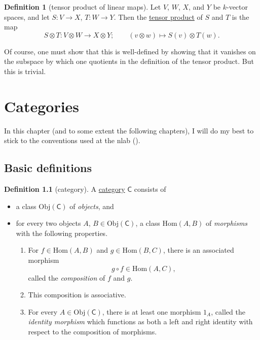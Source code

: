 \documentclass[a4paper]{report}
\newcommand{\defn}[1]{\ul{#1}}
\newcommand{\Obj}{\mathrm{Obj}}
\newcommand{\Hom}{\mathrm{Hom}}
\theoremstyle{definition}
\newtheorem{definition}{Definition}[section]
\theoremstyle{plain}
\theoremstyle{remark}
\begin{document}
\begin{definition}[tensor product of linear maps]
  \label{def:tensorproductoflinearmaps}
  Let $V$, $W$, $X$, and $Y$ be $k$-vector spaces, and let $S\colon V \to X$, $T\colon W \to Y$. Then the \defn{tensor product} of $S$ and $T$ is the map
  \begin{equation*}
    S \otimes T\colon V \otimes W \to X \otimes Y;\qquad (v \otimes w) \mapsto S(v) \otimes T(w).
  \end{equation*}

  Of course, one must show that this is well-defined by showing that it vanishes on the subspace by which one quotients in the definition of the tensor product. But this is trivial.
\end{definition}

\chapter{Categories} 
In this chapter (and to some extent the following chapters), I will do my best to stick to the conventions used at the nlab (\cite{nlab}).

\section{Basic definitions} \label{sec:categoriesbasicdefinitions}
\begin{definition}[category] 
  \label{def:category} 
  A \defn{category} $\mathsf{C}$ consists of 
  \begin{itemize} 
    \item a class $\Obj(\mathsf{C})$ of \emph{objects}, and \item for every two objects $A$, $B \in \Obj(\mathsf{C})$, a class $\Hom(A,B)$ of \emph{morphisms} with the following properties.  
      \begin{enumerate} 
        \item \label{item:compositionofmorphisms} For $f \in \Hom(A,B)$ and $g \in \Hom(B,C)$, there is an associated morphism 
          \begin{equation*} 
            g \circ f \in \Hom(A,C), 
          \end{equation*} called the \emph{composition} of $f$ and $g$.

        \item This composition is associative.

        \item \label{item:existenceofidentitymorphism} For every $A \in \Obj(\mathsf{C})$, there is at least one morphism $1_{A}$, called the \emph{identity morphism} which functions as both a left and right identity with respect to the composition of morphisms.

      \end{enumerate} 
  \end{itemize} 
\end{definition}
\end{document}
